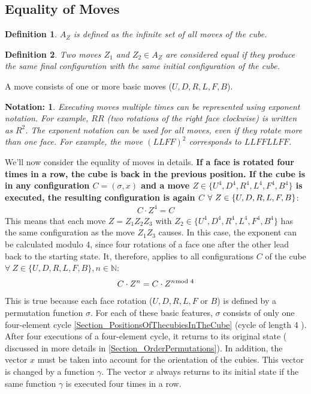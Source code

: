 \documentclass[12pt,a4paper]{article}
\theoremstyle{custom}
\newtheorem*{definition}{Definition}
\newtheorem*{notation}{Notation:}
\begin{document}
\subsection{Equality of Moves}
\label{Section_EqualityOfmoves}

\begin{definition}
  $A_Z$ is defined as the infinite set of all moves of the cube.  
\end{definition}
\begin{definition}
Two moves $Z_1$ and $Z_2 \in A_Z$ are considered equal if they produce the same final configuration with the same initial configuration of the cube.
\end{definition}
A move consists of one or more basic moves ($U, D, R, L, F, B$).

\begin{notation}
 Executing moves multiple times can be represented using exponent notation. For example, $RR$ (two rotations of the right face clockwise) is  written as $R^2$. The exponent notation can be used for all moves, even if they rotate more than one face. For example, the move $(LLFF)^2$  corresponds to $LLFFLLFF$.   
\end{notation}

We'll now consider the equality of moves in details.
\textbf {If a face is rotated four times in a row, the cube is back in the previous position. If the cube is in any configuration $C = (\sigma, x)$ and a move $Z \in \{ U^4, D^4, R^4, L^4, F^4, B^4 \}$ is executed, the resulting configuration is again $C$} $\forall \ Z \in \{ U, D, R, L, F, B\} \\ $:
\begin{align*}
C \cdot Z^4 = C
\end{align*}
This means that each move $Z = Z_1Z_2Z_3$ with $Z_2 \in \{ U^4, D^4, R^4, L^4, F^4, B^4\}$ has the same configuration as the move $Z_1Z_3$ causes.
In this case, the exponent can be calculated modulo 4, since four rotations of a face one after the other lead back to the starting state.
It, therefore, applies to all configurations $C$ of the cube $\forall \ Z \in \{U, D, R, L, F, B\}, n \in \mathbb{N} $:
\begin{align*}
 C \cdot Z^n= C \cdot Z^{n \hspace*{-0.5em} \mod 4}
\end{align*}
This is true because each face rotation ($U, D, R, L, F$ or $B$) is defined by a permutation function $\sigma$. For each of these basic features, $\sigma$ consists of only one four-element cycle \ref{Section_PositionsOfThecubiesInTheCube} (cycle of length 4 ).  After four executions of a four-element cycle, it returns to its original state ( discussed in more details in \ref{Section_OrderPermutations}). In addition, the vector $x$ must be taken into account for the orientation of the cubies. This vector is changed by a function $\gamma$. The vector $x$ always returns to its initial state if the same function $\gamma$ is executed four times in a row. 
\end{document}
